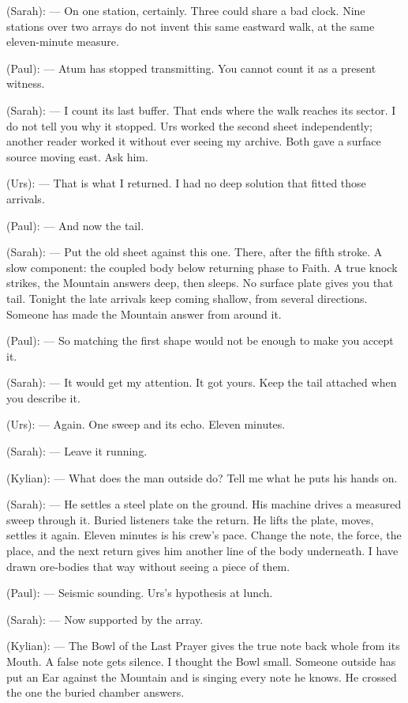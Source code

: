 \begin{room}
(Sarah): --- On one station, certainly. Three could share a bad clock. Nine stations over two arrays do not invent this same eastward walk, at the same eleven-minute measure.

(Paul): --- Atum has stopped transmitting. You cannot count it as a present witness.

(Sarah): --- I count its last buffer. That ends where the walk reaches its sector. I do not tell you why it stopped. Urs worked the second sheet independently; another reader worked it without ever seeing my archive. Both gave a surface source moving east. Ask him.

(Urs): --- That is what I returned. I had no deep solution that fitted those arrivals.

(Paul): --- And now the tail.

(Sarah): --- Put the old sheet against this one. There, after the fifth stroke. A slow component: the coupled body below returning phase to Faith. A true knock strikes, the Mountain answers deep, then sleeps. No surface plate gives you that tail. Tonight the late arrivals keep coming shallow, from several directions. Someone has made the Mountain answer from around it.

(Paul): --- So matching the first shape would not be enough to make you accept it.

(Sarah): --- It would get my attention. It got yours. Keep the tail attached when you describe it.

(Urs): --- Again. One sweep and its echo. Eleven minutes.

(Sarah): --- Leave it running.

(Kylian): --- What does the man outside do? Tell me what he puts his hands on.

(Sarah): --- He settles a steel plate on the ground. His machine drives a measured sweep through it. Buried listeners take the return. He lifts the plate, moves, settles it again. Eleven minutes is his crew's pace. Change the note, the force, the place, and the next return gives him another line of the body underneath. I have drawn ore-bodies that way without seeing a piece of them.

(Paul): --- Seismic sounding. Urs's hypothesis at lunch.

(Sarah): --- Now supported by the array.

(Kylian): --- The Bowl of the Last Prayer gives the true note back whole from its Mouth. A false note gets silence. I thought the Bowl small. Someone outside has put an Ear against the Mountain and is singing every note he knows. He crossed the one the buried chamber answers.


\end{room}
